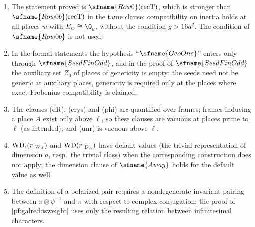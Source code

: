 \begin{remark}\label{pf:galred:rem}
\begin{enumerate}[label=(\alph*),nosep]
\item The statement proved is $\sfname{Row0}(\mathrm{recT})$, which is stronger than $\sfname{Row0b}(\mathrm{recT})$ in the
  tame clause: compatibility on inertia holds at all places $w$ with $E_w\cong\Q_g$, without the condition $g>16a^2$. The
  condition of $\sfname{Row0b}$ is not used.
\item In the formal statements the hypothesis ``$\sfname{GeoOne}$'' enters only through $\sfname{SeedFinOdd}$, and in the proof of
  $\sfname{SeedFinOdd}$ the auxiliary set $Z_0$ of places of genericity is empty: the seeds need not be generic at auxiliary
  places, genericity is required only at the places where exact Frobenius compatibility is claimed.
\item The clauses (dR), (crys) and (phi) are quantified over frames; frames inducing a place $A$ exist only above $\ell$, so these
  clauses are vacuous at places prime to $\ell$ (as intended), and (unr) is vacuous above $\ell$.
\item $\mathrm{WD}_\iota(r|_{W_A})$ and $\mathrm{WD}(r|_{D_A})$ have default values (the trivial representation of dimension $a$,
  resp.\ the trivial class) when the corresponding construction does not apply; the dimension clause of $\sfname{Away}$ holds for
  the default value as well.
\item The definition of a polarized pair requires a nondegenerate invariant pairing between $\pi\otimes\psi^{-1}$ and $\pi$ with
  respect to complex conjugation; the proof of \cref{pf:galred:isweight} uses only the resulting relation between infinitesimal
  characters.
\end{enumerate}
\end{remark}
